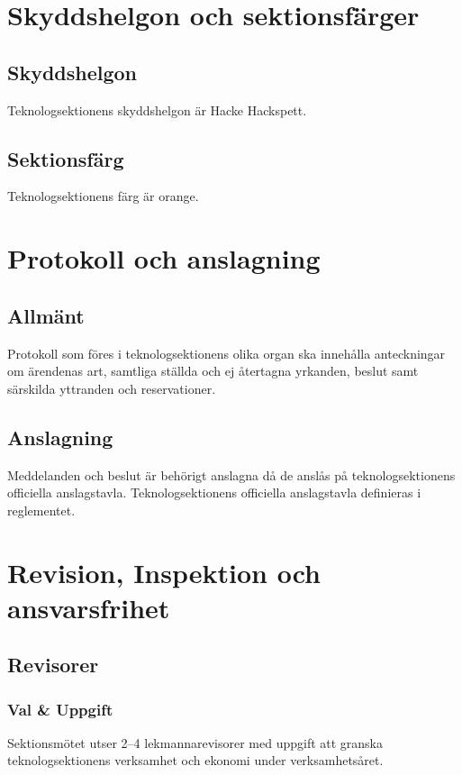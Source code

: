 \documentclass[a4paper]{dtek}
\begin{document}
\section{Skyddshelgon och sektionsfärger}
\subsection{Skyddshelgon}
Teknologsektionens skyddshelgon är Hacke Hackspett.
\subsection{Sektionsfärg}
Teknologsektionens färg är orange.
\newpage

\section{Protokoll och anslagning}
\subsection{Allmänt}
Protokoll som föres i teknologsektionens olika organ ska innehålla anteckningar om ärendenas art, samtliga ställda och ej återtagna yrkanden, beslut samt särskilda yttranden och reservationer.
\subsection{Anslagning}
Meddelanden och beslut är behörigt anslagna då de anslås på teknologsektionens
officiella anslagstavla. Teknologsektionens officiella anslagstavla definieras i
reglementet.
\newpage

\section{Revision, Inspektion och ansvarsfrihet}
\subsection{Revisorer}
\subsubsection{Val \& Uppgift}
Sektionsmötet utser 2–4 lekmannarevisorer med uppgift att granska teknologsektionens verksamhet och ekonomi under verksamhetsåret.
\end{document}
